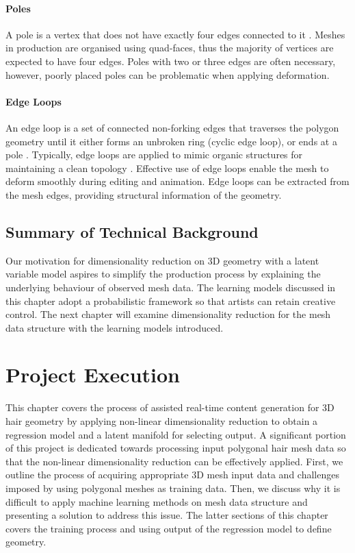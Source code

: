 \documentclass[ %
author={Dillon Keith Diep},
supervisor={Dr. Carl Henrik Ek},
degree={MEng},
title={ART-CG:},
subtitle={Assisted Real-time Content Generation of 3D Hair by Learning Manifolds},
type={Research},
year={2017} ]{dissertation}
\begin{document}
\subsubsection{Poles}
A pole is a vertex that does not have exactly four edges connected to it \cite[p.92]{blenderstudio}. Meshes in production are organised using quad-faces, thus the majority of vertices are expected to have four edges. Poles with two or three edges are often necessary, however, poorly placed poles can be problematic when applying deformation.

\subsubsection{Edge Loops}
An edge loop is a set of connected non-forking edges that traverses the polygon geometry until it either forms an unbroken ring (cyclic edge loop), or ends at a pole \cite[p.93]{blenderstudio}. Typically, edge loops are applied to mimic organic structures for maintaining a clean topology \cite[pp.10-12]{edgeloops}. Effective use of edge loops enable the mesh to deform smoothly during editing and animation. Edge loops can be extracted from the mesh edges, providing structural information of the geometry.

\section{Summary of Technical Background}
Our motivation for dimensionality reduction on 3D geometry with a latent variable model aspires to simplify the production process by explaining the underlying behaviour of observed mesh data. The learning models discussed in this chapter adopt a probabilistic framework so that artists can retain creative control. The next chapter will examine dimensionality reduction for the mesh data structure with the learning models introduced.

\chapter{Project Execution}
\label{chap:execution}

This chapter covers the process of assisted real-time content generation for 3D hair geometry by applying non-linear dimensionality reduction to obtain a regression model and a latent manifold for selecting output. A significant portion of this project is dedicated towards processing input polygonal hair mesh data so that the non-linear dimensionality reduction can be effectively applied. First, we outline the process of acquiring appropriate 3D mesh input data and challenges imposed by using polygonal meshes as training data. Then, we discuss why it is difficult to apply machine learning methods on mesh data structure and presenting a solution to address this issue. The latter sections of this chapter covers the training process and using output of the regression model to define geometry.
\end{document}
